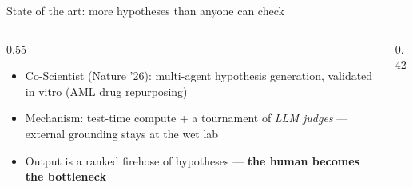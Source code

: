 \documentclass[aspectratio=169,10pt]{beamer}
\gdef\SlideCite{}
\newcommand{\citefield}[1]{\gdef\SlideCite{#1}}
\begin{document}
\begin{frame}{State of the art: more hypotheses than anyone can check}
  \citefield{\href{https://doi.org/10.1038/s41586-026-10644-y}{Gottweis et al., Nature 655, 487--496 (2026)}}
  \begin{columns}[T]
    \begin{column}{0.55\textwidth}
      \begin{itemize}
        \item Co-Scientist (Nature '26): multi-agent hypothesis generation,
              validated in vitro (AML drug repurposing)
        \item Mechanism: test-time compute + a tournament of \emph{LLM judges}
              --- external grounding stays at the wet lab
        \item Output is a ranked firehose of hypotheses ---
              \textbf{the human becomes the bottleneck}
      \end{itemize}
    \end{column}
    \begin{column}{0.42\textwidth}
      \centering
    \end{column}
  \end{columns}
\end{frame}
\end{document}
